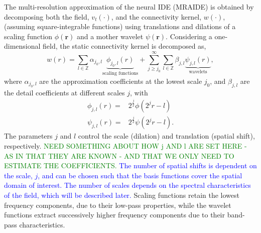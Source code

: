 \documentclass[review,authoryear,3p]{elsarticle}
\newcommand{\dean}[1]{\textcolor{green}{#1}}
\newcommand{\parham}[1]{\textcolor{blue}{#1}}
\begin{document}
The multi-resolution approximation \citep{Mallat1989a} of the neural IDE (MRAIDE) is obtained by decomposing both the field, $v_t(\cdot)$, and the connectivity kernel, $w(\cdot)$, (assuming square-integrable functions) using translations and dilations of a scaling function $\phi(\mathbf{r})$ and a mother wavelet $\psi(\mathbf{r})$. Considering a  one-dimensional field, the static connectivity kernel is decomposed as,
\begin{equation}
 w\left(r\right)=\sum_{l\in \mathbb{Z}}\alpha_{j_0,l} \underbrace{\phi_{j_0,l}\left(r\right)}_{\text{scaling functions}} + \sum_{j\geq j_0}^{\infty} \sum_{l \in \mathbb{Z}}\beta_{j,l} \underbrace{\psi_{j,l}\left(r\right)}_{\text{wavelets}}, 
\label{eq:KernelExpansion}
\end{equation}
where $\alpha_{j_0,l}$ are the approximation coefficients at the lowest scale $j_0$, and $\beta_{j,l}$ are the detail coefficients at different scales $j$, with
\begin{align}
\phi_{j,l}\left(r\right) =& 2^{\frac{j}{2}}\phi\left(2^j r-l\right) \\	
\psi_{j,l}\left(r\right) =& 2^{\frac{j}{2}}\psi\left(2^j r-l\right).
\end{align}
The parameters $j$ and $l$ control the scale (dilation) and translation (spatial shift), respectively. \dean{NEED SOMETHING ABOUT HOW j AND l ARE SET HERE - AS IN THAT THEY ARE KNOWN - AND THAT WE ONLY NEED TO ESTIMATE THE COEFFICIENTS.} \parham{The number of spatial shifts is dependent on the scale, $j$, and can be chosen such that the basis functions cover the spatial domain of interest. The number of scales depends on the spectral characteristics of the field, which will be described later.} Scaling functions retain the lowest frequency components, due to their low-pass properties, while the wavelet functions extract successively higher frequency components due to their band-pass characteristics. 

\end{document}

